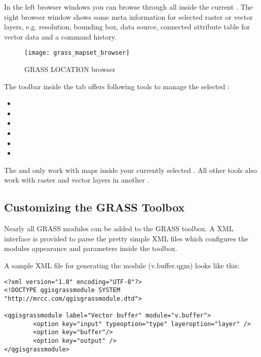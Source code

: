 In the left browser windows you can browse through all  
inside the current . The right browser window shows some 
meta information for selected raster or vector layers, e.g. resolution, 
bounding box, data source, connected attribute table for vector data and a 
command history.

\begin{figure}[h]
 \centering
 \texttt{[image: grass\_mapset\_browser]}
 \caption{GRASS LOCATION browser \nixcaption}\label{fig:grass_mapset_browser}
\end{figure}

The toolbar inside the  tab offers following tools to manage 
the selected :

\begin{itemize}[label=--]
\item {}
\item {}
\item {}
\item {}
\item {}
\item {}
\end{itemize}

The  and 
 only work with maps inside 
your currently selected . All other tools also work with 
raster and vector layers in another .

\subsection{Customizing the GRASS Toolbox} 
\label{sec:toolbox-customizing}

Nearly all GRASS modules can be added to the GRASS toolbox. A XML 
interface is provided to parse the pretty simple XML files which configures 
the modules appearance and parameters inside the toolbox.

A sample XML file for generating the module  (v.buffer.qgm) 
looks like this:
\begin{verbatim}
<?xml version="1.0" encoding="UTF-8"?>
<!DOCTYPE qgisgrassmodule SYSTEM "http://mrcc.com/qgisgrassmodule.dtd">

<qgisgrassmodule label="Vector buffer" module="v.buffer">
        <option key="input" typeoption="type" layeroption="layer" />
        <option key="buffer"/>
        <option key="output" />
</qgisgrassmodule>
\end{verbatim}

